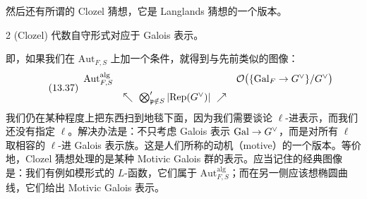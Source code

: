 然后还有所谓的 Clozel 猜想，它是 Langlands 猜想的一个版本。

\begin{srcconj}{2 (Clozel)}
代数自守形式对应于 Galois 表示。
\end{srcconj}

即，如果我们在 $\mathrm{Aut}_{F,S}$ 上加一个条件，就得到与先前类似的图像：
\begin{equation}\tag{13.37}
\begin{array}{ccc}
\mathrm{Aut}^{\mathrm{alg}}_{F,S} & & \cO\bigl(\{\Gal_F\to G^\vee\}/G^\vee\bigr)\\[6pt]
& \nwarrow\ \bigotimes'_{\mathfrak p\notin S}|\Rep(G^\vee)|\ \nearrow &
\end{array}
\end{equation}
我们仍在某种程度上把东西扫到地毯下面，因为我们需要谈论 $\ell$-进表示，而我们还没有指定 $\ell$。解决办法是：不只考虑 Galois 表示 $\mathrm{Gal}\to G^\vee$，而是对所有 $\ell$ 取相容的 $\ell$-进 Galois 表示族。这是人们所称的动机（motive）的一个版本。等价地，Clozel 猜想处理的是某种 Motivic Galois 群的表示。应当记住的经典图像是：我们有例如模形式的 $L$-函数，它们属于 $\mathrm{Aut}^{\mathrm{alg}}_{F,S}$；而在另一侧应该想椭圆曲线，它们给出 Motivic Galois 表示。

